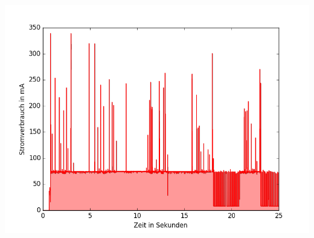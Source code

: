 \documentclass[18pt]{beamer}
\begin{document}
\begin{frame}
	\begin{minipage}[c][\textheight][c]{\textwidth}
		\centering
		\includegraphics[height=0.95\textheight]{plots/wifills.png}
	\end{minipage}
\end{frame}
\end{document}
